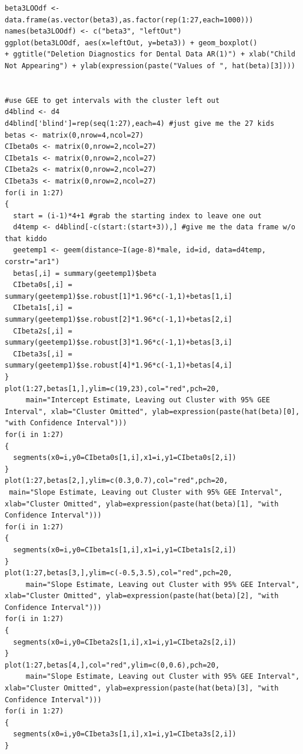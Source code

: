 \documentclass[11pt]{article}
\begin{document}
\begin{verbatim}
beta3LOOdf <- data.frame(as.vector(beta3),as.factor(rep(1:27,each=1000)))
names(beta3LOOdf) <- c("beta3", "leftOut")
ggplot(beta3LOOdf, aes(x=leftOut, y=beta3)) + geom_boxplot() 
+ ggtitle("Deletion Diagnostics for Dental Data AR(1)") + xlab("Child Not Appearing") + ylab(expression(paste("Values of ", hat(beta)[3])))


#use GEE to get intervals with the cluster left out
d4blind <- d4
d4blind['blind']=rep(seq(1:27),each=4) #just give me the 27 kids
betas <- matrix(0,nrow=4,ncol=27)
CIbeta0s <- matrix(0,nrow=2,ncol=27)
CIbeta1s <- matrix(0,nrow=2,ncol=27)
CIbeta2s <- matrix(0,nrow=2,ncol=27)
CIbeta3s <- matrix(0,nrow=2,ncol=27)
for(i in 1:27)
{
  start = (i-1)*4+1 #grab the starting index to leave one out
  d4temp <- d4blind[-c(start:(start+3)),] #give me the data frame w/o that kiddo
  geetemp1 <- geem(distance~I(age-8)*male, id=id, data=d4temp, corstr="ar1")
  betas[,i] = summary(geetemp1)$beta
  CIbeta0s[,i] = summary(geetemp1)$se.robust[1]*1.96*c(-1,1)+betas[1,i]
  CIbeta1s[,i] = summary(geetemp1)$se.robust[2]*1.96*c(-1,1)+betas[2,i]
  CIbeta2s[,i] = summary(geetemp1)$se.robust[3]*1.96*c(-1,1)+betas[3,i]
  CIbeta3s[,i] = summary(geetemp1)$se.robust[4]*1.96*c(-1,1)+betas[4,i]
}
plot(1:27,betas[1,],ylim=c(19,23),col="red",pch=20,
     main="Intercept Estimate, Leaving out Cluster with 95% GEE Interval", xlab="Cluster Omitted", ylab=expression(paste(hat(beta)[0], "with Confidence Interval")))
for(i in 1:27)
{
  segments(x0=i,y0=CIbeta0s[1,i],x1=i,y1=CIbeta0s[2,i])
}
plot(1:27,betas[2,],ylim=c(0.3,0.7),col="red",pch=20,
 main="Slope Estimate, Leaving out Cluster with 95% GEE Interval", xlab="Cluster Omitted", ylab=expression(paste(hat(beta)[1], "with Confidence Interval")))
for(i in 1:27)
{
  segments(x0=i,y0=CIbeta1s[1,i],x1=i,y1=CIbeta1s[2,i])
}
plot(1:27,betas[3,],ylim=c(-0.5,3.5),col="red",pch=20,
     main="Slope Estimate, Leaving out Cluster with 95% GEE Interval", xlab="Cluster Omitted", ylab=expression(paste(hat(beta)[2], "with Confidence Interval")))
for(i in 1:27)
{
  segments(x0=i,y0=CIbeta2s[1,i],x1=i,y1=CIbeta2s[2,i])
}
plot(1:27,betas[4,],col="red",ylim=c(0,0.6),pch=20,
     main="Slope Estimate, Leaving out Cluster with 95% GEE Interval", xlab="Cluster Omitted", ylab=expression(paste(hat(beta)[3], "with Confidence Interval")))
for(i in 1:27)
{
  segments(x0=i,y0=CIbeta3s[1,i],x1=i,y1=CIbeta3s[2,i])
}



\end{verbatim}
\end{document}

